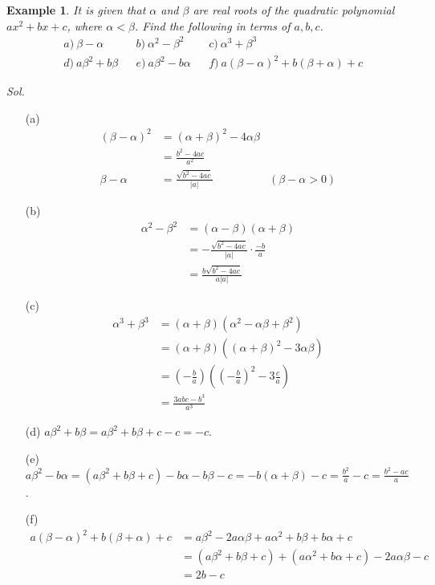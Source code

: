 \documentclass[12pt]{article}
\newtheorem{example}{Example}
\begin{document}
    \begin{example}
        It is given that $\alpha$ and $\beta$ are real roots of the quadratic polynomial $ax^2+bx+c$, where $\alpha<\beta$. Find the following in terms of $a,b,c$.\begin{align*}
            &a)\ \beta-\alpha&&b)\ \alpha^2-\beta^2&&c)\ \alpha^3+\beta^3\\
            &d)\ a\beta^2+b\beta&&e)\ a\beta^2-b\alpha&&f)\ a(\beta-\alpha)^2+b(\beta+\alpha)+c
        \end{align*}
    \end{example}

    \textit{ Sol.}\begin{enumerate}
        \item[(a)] \begin{align*}
            (\beta-\alpha)^2&=(\alpha+\beta)^2-4\alpha\beta\\
            &=\frac{b^2-4ac}{a^2}\\
            \beta-\alpha&=\frac{\sqrt{b^2-4ac}}{|a|}&(\beta-\alpha>0)
        \end{align*} 
        \item[(b)] \begin{align*}
            \alpha^2-\beta^2&=(\alpha-\beta)(\alpha+\beta)\\
            &=-\frac{\sqrt{b^2-4ac}}{|a|}\cdot \frac{-b}{a}\\
            &=\frac{b\sqrt{b^2-4ac}}{a|a|}
        \end{align*}
        \item[(c)] \begin{align*}
            \alpha^3+\beta^3&=(\alpha+\beta)(\alpha^2-\alpha\beta+\beta^2)\\
            &=(\alpha+\beta)((\alpha+\beta)^2-3\alpha\beta)\\
            &=(-\frac{b}{a})((-\frac{b}{a})^2-3\frac{c}{a})\\
            &=\frac{3abc-b^3}{a^3}
        \end{align*}
        \item[(d)] $a\beta^2+b\beta=a\beta^2+b\beta+c-c=-c$.
        \item[(e)] $\displaystyle a\beta^2-b\alpha=(a\beta^2+b\beta+c)-b\alpha-b\beta-c=-b(\alpha+\beta)-c=\frac{b^2}{a}-c=\frac{b^2-ac}{a}$.
        \item[(f)] \begin{align*}
            a(\beta-\alpha)^2+b(\beta+\alpha)+c&=a\beta^2-2a\alpha\beta+a\alpha^2+b\beta+b\alpha+c\\
            &=(a\beta^2+b\beta+c)+(a\alpha^2+b\alpha+c)-2a\alpha\beta-c\\
            &=2b-c
        \end{align*}
    \end{enumerate}
\end{document}
